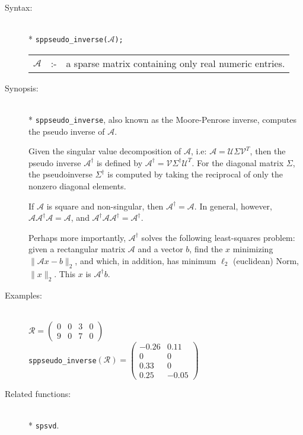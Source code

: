 \begin{description}
\item[Syntax:]\mbox{}\\*
\texttt{sppseudo\_inverse($\mathcal{A}$);}\\[2mm]
\begin{tabular}{l l l}
$\mathcal{A}$ &:-& a sparse matrix containing only real numeric entries.
\end{tabular}

\item[Synopsis:]\mbox{}\\*
\texttt{sppseudo\_inverse}, also known as the Moore-Penrose inverse, computes
the pseudo inverse of $\mathcal{A}$.

Given the singular value decomposition of $\mathcal{A}$, i.e: $\mathcal{A} =
\mathcal{U}
\Sigma\mathcal{V}^T$, then the pseudo inverse $\mathcal{A}^{\dagger}$ is defined
by $\mathcal{A}^{\dagger} = \mathcal{V} \Sigma^{\dagger} \mathcal{U}^{T}$. For the
diagonal
matrix $\Sigma$, the pseudoinverse $\Sigma^{\dagger}$ is computed by taking the reciprocal
of only the nonzero diagonal elements.

If $\mathcal{A}$ is square and non-singular, then $\mathcal{A}^{\dagger} = \mathcal{A}$.
In general, however,
$\mathcal{A} \mathcal{A}^{\dagger} \mathcal{A} = \mathcal{A}$, and
$\mathcal{A}^{\dagger} \mathcal{A} \mathcal{A}^{\dagger} = \mathcal{A}^{\dagger}$.

Perhaps more importantly, $\mathcal{A}^{\dagger}$ solves the following least-squares
problem: given a rectangular matrix $\mathcal{A}$ and a vector $b$, find the
$x$ minimizing $\|\mathcal{A}x - b\|_2$,
and which, in addition, has minimum $\ell_{2}$ (euclidean) Norm, $\|x\|_2$.
This $x$ is $\mathcal{A}^{\dagger} b$.

\item[Examples:]\mbox{}\\
\(\mathcal{R} = \begin{pmatrix} 0 & 0 & 3 & 0 \\ 9 & 0 & 7 & 0 \end{pmatrix}\) \\[2mm]
\texttt{sppseudo\_inverse}\((\mathcal{R}) =
        \begin{pmatrix} -0.26 & 0.11 \\ 0 & 0 \\ 0.33 & 0 \\ 0.25 & -0.05 \end{pmatrix}\)

\item[Related functions:]\mbox{}\\*
 \texttt{spsvd}.
\end{description}

